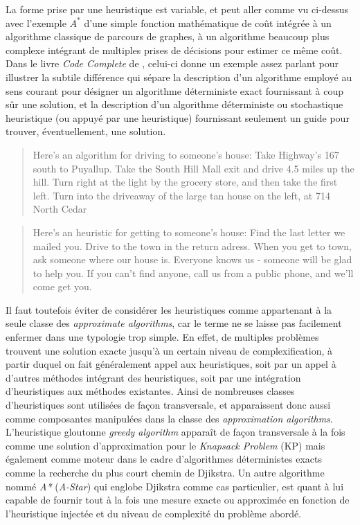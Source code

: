 La forme prise par une heuristique est variable, et peut aller comme vu ci-dessus avec l'exemple $A^*$ d'une simple fonction mathématique de coût intégrée à un algorithme classique de parcours de graphes, à un algorithme beaucoup plus complexe intégrant de multiples prises de décisions pour estimer ce même coût. Dans le livre \textit{Code Complete} de \textcite[12]{McConnell2004}, celui-ci donne un exemple assez parlant pour illustrer la subtile différence qui sépare la description d'un algorithme employé au sens courant pour désigner un algorithme déterministe exact fournissant à coup sûr une solution, et la description d'un algorithme déterministe ou stochastique heuristique (ou appuyé par une heuristique) fournissant seulement un guide pour trouver, éventuellement, une solution.

\foreignblockquote{english}{Here's an algorithm for driving to someone's house: Take Highway's 167 south to Puyallup. Take the South Hill Mall exit and drive 4.5 miles up the hill. Turn right at the light by the grocery store, and then take the first left. Turn into the driveaway of the large tan house on the left, at 714 North Cedar}

\foreignblockquote{english}{Here's an heuristic for getting to someone's house: Find the last letter we mailed you. Drive to the town in the return adress. When you get to town, ask someone where our house is. Everyone knows us - someone will be glad to help you. If you can't find anyone, call us from a public phone, and we'll come get you.}

Il faut toutefois éviter de considérer les heuristiques comme appartenant à la seule classe des \textit{approximate algorithms}, car le terme ne se laisse pas facilement enfermer dans une typologie trop simple. En effet, de multiples problèmes trouvent une solution exacte jusqu'à un certain niveau de complexification, à partir duquel on fait généralement appel aux heuristiques, soit par un appel à d'autres méthodes intégrant des heuristiques, soit par une intégration d'heuristiques aux méthodes existantes. Ainsi de nombreuses classes d'heuristiques sont utilisées de façon transversale, et apparaissent donc aussi comme composantes manipulées dans la classe des \textit{approximation algorithms}. L'heuristique gloutonne \textit{greedy algorithm} apparaît de façon transversale à la fois comme une solution d'approximation pour le \textit{Knapsack Problem} (KP) mais également comme moteur dans le cadre d'algorithmes déterministes exacts comme la recherche du plus court chemin de Djikstra. Un autre algorithme nommé \textit{A*} (\textit{A-Star}) qui englobe Djikstra comme cas particulier, est quant à lui capable de fournir tout à la fois une mesure exacte ou approximée en fonction de l'heuristique injectée et du niveau de complexité du problème abordé.

